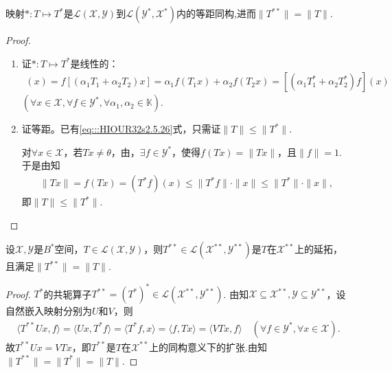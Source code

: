 \documentclass[../../main.tex]{subfiles}%
\begin{document}
\begin{theorem}\label{theorem:泛函分析--等距同构基本定理}
映射$*:T\mapsto T^*$是$\mathscr{L}(\mathscr{X},\mathscr{Y})$到$\mathscr{L}(\mathscr{Y}^*,\mathscr{X}^*)$内的等距同构,进而$\|T^{**}\|=\|T\|$.
\end{theorem}
\begin{proof}
\begin{enumerate}[(1)]
\item 证$*:T\mapsto T^*$是线性的：
\begin{align*}
[(\alpha_1T_1+\alpha_2T_2)^*f](x)=f[(\alpha_1T_1+\alpha_2T_2)x]
=\alpha_1f(T_1x)+\alpha_2f(T_2x)=[(\alpha_1T_1^*+\alpha_2T_2^*)f](x)
\end{align*}
$(\forall x\in\mathscr{X},\forall f\in\mathscr{Y}^*,\forall\alpha_1,\alpha_2\in\mathbb{K})$.

\item 证等距。已有\eqref{eq:::HIOUR32s2.5.26}式，只需证$\|T\|\leqslant\|T^*\|$.

对$\forall x\in\mathscr{X}$，若$Tx\neq\theta$，由，$\exists f\in\mathscr{Y}^*$，使得$f(Tx)=\|Tx\|$，且$\|f\|=1$. 于是由知
\begin{align*}
\|Tx\|=f(Tx)=(T^*f)(x)\leqslant\|T^*f\|\cdot\|x\|\leqslant\|T^*\|\cdot\|x\|,
\end{align*}
即$\|T\|\leqslant\|T^*\|$.
\end{enumerate}

\end{proof}

\begin{theorem}
设$\mathscr{X},\mathscr{Y}$是$B^*$空间，$T\in\mathscr{L}(\mathscr{X},\mathscr{Y})$，则$T^{**}\in\mathscr{L}(\mathscr{X}^{**},\mathscr{Y}^{**})$是$T$在$\mathscr{X}^{**}$上的延拓，且满足$\|T^{**}\|=\|T\|$.
\end{theorem}
\begin{proof}

$T^*$的共轭算子$T^{**}=(T^*)^*\in\mathscr{L}(\mathscr{X}^{**},\mathscr{Y}^{**})$. 由知$\mathscr{X}\subseteq\mathscr{X}^{**},\mathscr{Y}\subseteq\mathscr{Y}^{**}$，设自然嵌入映射分别为$U$和$V$，则
\begin{align*}
\langle T^{**}Ux,f\rangle=\langle Ux,T^*f\rangle
=\langle T^*f,x\rangle=\langle f,Tx\rangle
=\langle VTx,f\rangle\quad (\forall f\in\mathscr{Y}^*,\forall x\in\mathscr{X}).
\end{align*}
故$T^{**}Ux=VTx$，即$T^{**}$是$T$在$\mathscr{X}^{**}$上的同构意义下的扩张.由知$\|T^{**}\|=\|T^*\|=\|T\|$.

\end{proof}
\end{document}
